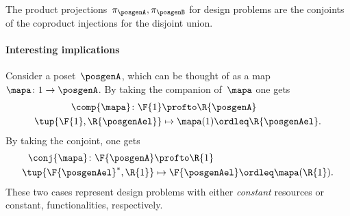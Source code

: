 \begin{example}
    The product projections~$\pi_\posgenA, \pi_\posgenB$ for design problems are the conjoints of the coproduct injections for the disjoint union.
\end{example}

\paragraph{Interesting implications}
Consider a poset~$\posgenA$, which can be thought of as a map~$\mapa \colon 1\to \posgenA$.
By taking the companion of~$\mapa$ one gets
\begin{equation}
    \begin{aligned}
        \comp{\mapa}\colon \F{1}   & \profto \R{\posgenA}                    \\
        \tup{\F{1},\R{\posgenAel}} & \mapsto \mapa(1)\ordleq \R{\posgenAel}. 
    \end{aligned}
\end{equation}
By taking the conjoint, one gets
\begin{equation}
    \begin{aligned}
        \conj{\mapa}\colon \F{\posgenA} & \profto \R{1}                               \\
        \tup{\F{\posgenAel}^*,\R{1}}    & \mapsto \F{\posgenAel}\ordleq \mapa(\R{1}). 
    \end{aligned}
\end{equation}
These two cases represent design problems with either \emph{constant} resources or constant, functionalities, respectively.